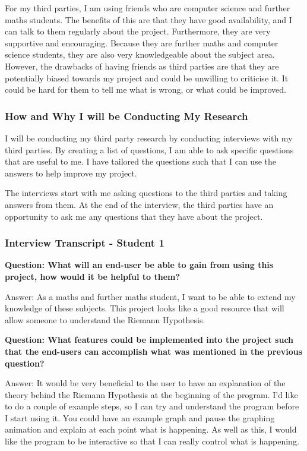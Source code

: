 \documentclass[12pt]{article}
\begin{document}
For my third parties, I am using friends who are computer science and further maths students. The benefits of this are that they have good availability, and I can talk to them regularly about the project. Furthermore, they are very supportive and encouraging. Because they are further maths and computer science students, they are also very knowledgeable about the subject area. However, the drawbacks of having friends as third parties are that they are potentially biased towards my project and could be unwilling to criticise it. It could be hard for them to tell me what is wrong, or what could be improved.

\subsubsection{How and Why I will be Conducting My Research}
I will be conducting my third party research by conducting interviews with my third parties. By creating a list of questions, I am able to ask specific questions that are useful to me. I have tailored the questions such that I can use the answers to help improve my project.

The interviews start with me asking questions to the third parties and taking answers from them. At the end of the interview, the third parties have an opportunity to ask me any questions that they have about the project.

\subsubsection{Interview Transcript - Student 1}

\textbf{Question: What will an end-user be able to gain from using this project, how would it be helpful to them?}

Answer: As a maths and further maths student, I want to be able to extend my knowledge of these subjects. This project looks like a good resource that will allow someone to understand the Riemann Hypothesis.

\textbf{Question: What features could be implemented into the project such that the end-users can accomplish what was mentioned in the previous question?}

Answer: It would be very beneficial to the user to have an explanation of the theory behind the Riemann Hypothesis at the beginning of the program. I'd like to do a couple of example steps, so I can try and understand the program before I start using it. You could have an example graph and pause the graphing animation and explain at each point what is happening. As well as this, I would like the program to be interactive so that I can really control what is happening.
\end{document}
